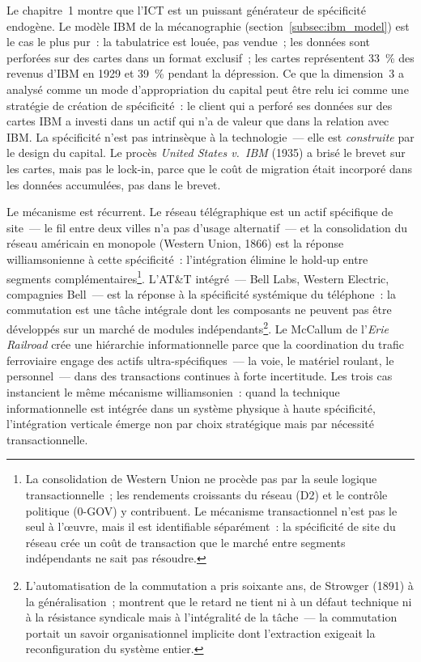 Le chapitre~1 montre que l'ICT est un puissant générateur de spécificité endogène. Le modèle IBM de la mécanographie (section~\ref{subsec:ibm_model}) est le cas le plus pur~: la tabulatrice est louée, pas vendue~; les données sont perforées sur des cartes dans un format exclusif~; les cartes représentent 33~\% des revenus d'IBM en 1929 et 39~\% pendant la dépression. Ce que la dimension~3 a analysé comme un mode d'appropriation du capital peut être relu ici comme une stratégie de création de spécificité~: le client qui a perforé ses données sur des cartes IBM a investi dans un actif qui n'a de valeur que dans la relation avec IBM. La spécificité n'est pas intrinsèque à la technologie~--- elle est \emph{construite} par le design du capital. Le procès \emph{United States v.~IBM} (1935) a brisé le brevet sur les cartes, mais pas le lock-in, parce que le coût de migration était incorporé dans les données accumulées, pas dans le brevet.

Le mécanisme est récurrent. Le réseau télégraphique est un actif spécifique de site~--- le fil entre deux villes n'a pas d'usage alternatif~--- et la consolidation du réseau américain en monopole (Western Union, 1866) est la réponse williamsonienne à cette spécificité~: l'intégration élimine le hold-up entre segments complémentaires\footnote{La consolidation de Western Union ne procède pas par la seule logique transactionnelle~; les rendements croissants du réseau (D2) et le contrôle politique (0-GOV) y contribuent. Le mécanisme transactionnel n'est pas le seul à l'œuvre, mais il est identifiable séparément~: la spécificité de site du réseau crée un coût de transaction que le marché entre segments indépendants ne sait pas résoudre.}. L'AT\&T intégré~--- Bell Labs, Western Electric, compagnies Bell~--- est la réponse à la spécificité systémique du téléphone~: la commutation est une tâche intégrale dont les composants ne peuvent pas être développés sur un marché de modules indépendants\footnote{L'automatisation de la commutation a pris soixante ans, de Strowger (1891) à la généralisation~; \textcite{feigenbaum_organizational_2024} montrent que le retard ne tient ni à un défaut technique ni à la résistance syndicale mais à l'intégralité de la tâche~--- la commutation portait un savoir organisationnel implicite dont l'extraction exigeait la reconfiguration du système entier.}. Le McCallum de l'\emph{Erie Railroad} crée une hiérarchie informationnelle parce que la coordination du trafic ferroviaire engage des actifs ultra-spécifiques~--- la voie, le matériel roulant, le personnel~--- dans des transactions continues à forte incertitude. Les trois cas instancient le même mécanisme williamsonien~: quand la technique informationnelle est intégrée dans un système physique à haute spécificité, l'intégration verticale émerge non par choix stratégique mais par nécessité transactionnelle.

